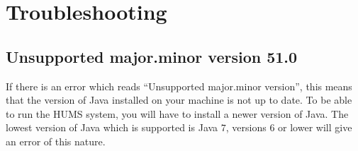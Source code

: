 \documentclass[10pt,a4paper]{article}
\begin{document}
\section{Troubleshooting}

\subsection{Unsupported major.minor version 51.0}

If there is an error which reads ``Unsupported major.minor version'', this means that the version of Java installed on your machine is not up to date. To be able to run the HUMS system, you will have to install a newer version of Java. The lowest version of Java which is supported is Java $7$, versions $6$ or lower will give an error of this nature.
\end{document}
